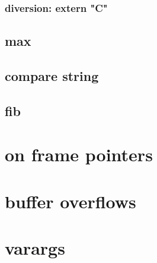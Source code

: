 \subsubsection{diversion: extern "C"}





\subsection{max}







\subsection{compare string}





\subsection{fib}





\section{on frame pointers}



\section{buffer overflows}



\section{varargs}



